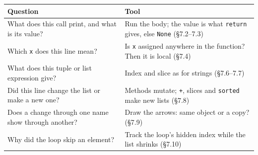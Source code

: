 \documentclass[11pt]{article}
\begin{document}
\begin{keepsection}
\begin{center}\small\begin{tabularx}{\linewidth}{>{\raggedright\arraybackslash}X>{\raggedright\arraybackslash}X}\toprule
\textbf{Question} & \textbf{Tool} \\ \midrule
What does this call print, and what is its value? & Run the body; the value is what \texttt{return} gives, else \texttt{None} (§7.2–7.3) \\
Which \texttt{x} does this line mean? & Is \texttt{x} assigned anywhere in the function? Then it is local (§7.4) \\
What does this tuple or list expression give? & Index and slice as for strings (§7.6–7.7) \\
Did this line change the list or make a new one? & Methods mutate; \texttt{+}, slices and \texttt{sorted} make new lists (§7.8) \\
Does a change through one name show through another? & Draw the arrows: same object or a copy? (§7.9) \\
Why did the loop skip an element? & Track the loop’s hidden index while the list shrinks (§7.10) \\
\bottomrule\end{tabularx}\end{center}
\end{keepsection}
\end{document}
